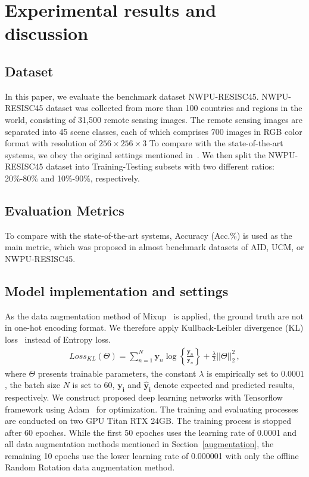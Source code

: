 \documentclass[sigconf]{acmart}
\begin{document}
\section{Experimental results and discussion}

\subsection{Dataset}
\label{dataset}

In this paper, we evaluate the benchmark dataset NWPU-RESISC45\cite{nwpu_dataset}.
NWPU-RESISC45 dataset was collected from more than 100 countries and regions in the world, consisting of 31,500 remote sensing images. 
The remote sensing images are separated into 45 scene classes, each of which comprises 700 images in RGB color format with resolution of $256\times256\times3$
To compare with the state-of-the-art systems, we obey the original settings mentioned in~\cite{nwpu_dataset}.
We then split the NWPU-RESISC45 dataset into Training-Testing subsets with two different ratios: 20\%-80\%  and 10\%-90\%, respectively.

\subsection{Evaluation Metrics}
To compare with the state-of-the-art systems, Accuracy (Acc.\%) is used as the main metric, which was proposed in almost benchmark datasets of AID\cite{aid_dataset}, UCM\cite{yang2010bag}, or NWPU-RESISC45\cite{nwpu_dataset}.  

\subsection{Model implementation and settings}
\label{setting}
As the data augmentation method of Mixup~\cite{mixup2} is applied, the ground truth are not in one-hot encoding format. 
We therefore apply Kullback-Leibler divergence (KL) loss~\cite{kl_loss} instead of Entropy loss.
%
\begin{align}
   \label{eq:kl_loss}
   Loss_{KL}(\Theta) = \sum_{n=1}^{N}\mathbf{y}_{n}\log \left\{ \frac{\mathbf{y}_{n}}{\mathbf{\hat{y}}_{n}} \right\}  +  \frac{\lambda}{2}||\Theta||_{2}^{2} \,,
\end{align}
where  \(\Theta\) presents trainable parameters, the constant \(\lambda\) is empirically set to $0.0001$, the batch size $N$ is set to 60, $\mathbf{y_{i}}$ and $\mathbf{\hat{y}_{i}}$ denote expected and predicted results, respectively.
We construct proposed deep learning networks with Tensorflow framework using
Adam~\cite{adam} for optimization.
The training and evaluating processes are conducted on two GPU Titan RTX 24GB.
The training process is stopped after 60 epoches. 
While the first 50 epoches uses the learning rate of 0.0001 and all data augmentation
methods mentioned in Section~\ref{augmentation}, the remaining 10 epochs use the lower learning rate of 0.000001 with only the offline Random Rotation data augmentation method.
\end{document}
